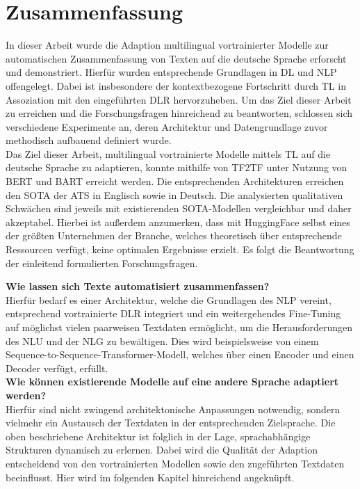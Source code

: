 \chapter{Zusammenfassung}
\thispagestyle{fancy}
\label{chap:Zusammenfassung}

\noindent
In dieser Arbeit wurde die Adaption multilingual vortrainierter Modelle zur automatischen Zusammenfassung von Texten auf die deutsche Sprache erforscht und demonstriert. Hierfür wurden entsprechende Grundlagen in \ac{DL} und \ac{NLP} offengelegt. Dabei ist insbesondere der kontextbezogene Fortschritt durch \ac{TL} in Assoziation mit den eingeführten \ac{DLR} hervorzuheben. Um das Ziel dieser Arbeit zu erreichen und die Forschungsfragen hinreichend zu beantworten, schlossen sich verschiedene Experimente an, deren Architektur und Datengrundlage zuvor methodisch aufbauend definiert wurde.\\

\noindent
Das Ziel dieser Arbeit, multilingual vortrainierte Modelle mittels \ac{TL} auf die deutsche Sprache zu adaptieren, konnte mithilfe von \ac{TF2TF} unter Nutzung von \ac{BERT} und \ac{BART} erreicht werden. Die entsprechenden Architekturen erreichen den \ac{SOTA} der \ac{ATS} in Englisch sowie in Deutsch. Die analysierten qualitativen Schwächen sind jeweils mit existierenden \ac{SOTA}-Modellen vergleichbar und daher akzeptabel. Hierbei ist außerdem anzumerken, dass mit HuggingFace selbst eines der größten Unternehmen der Branche, welches theoretisch über entsprechende Ressourcen verfügt, keine optimalen Ergebnisse erzielt. Es folgt die Beantwortung der einleitend formulierten Forschungsfragen.
\newpage

\noindent
\textbf{Wie lassen sich Texte automatisiert zusammenfassen?}\\
\noindent
Hierfür bedarf es einer Architektur, welche die Grundlagen des \ac{NLP} vereint, entsprechend vortrainierte \ac{DLR} integriert und ein weitergehendes Fine-Tuning auf möglichst vielen paarweisen Textdaten ermöglicht, um die Herausforderungen des \ac{NLU} und der {NLG} zu bewältigen. Dies wird beispielsweise von einem Sequence-to-Sequence-Transformer-Modell, welches über einen Encoder und einen Decoder verfügt, erfüllt.\\

\noindent
\textbf{Wie können existierende Modelle auf eine andere Sprache adaptiert werden?}\\
\noindent
Hierfür sind nicht zwingend architektonische Anpassungen notwendig, sondern vielmehr ein Austausch der Textdaten in der entsprechenden Zielsprache. Die oben beschriebene Architektur ist folglich in der Lage, sprachabhängige Strukturen dynamisch zu erlernen. Dabei wird die Qualität der Adaption entscheidend von den vortrainierten Modellen sowie den zugeführten Textdaten beeinflusst. Hier wird im folgenden Kapitel hinreichend angeknüpft.\\

